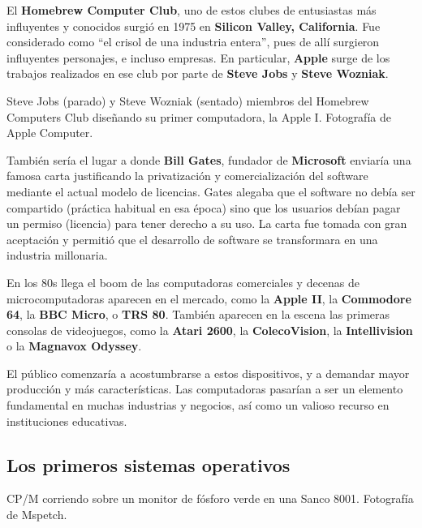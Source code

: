 El \textbf{Homebrew Computer Club}, uno de estos clubes de entusiastas más influyentes y
conocidos surgió en 1975 en \textbf{Silicon Valley, California}. Fue considerado
como ``el crisol de una industria entera'', pues de allí surgieron influyentes
personajes, e incluso empresas. En particular, \textbf{Apple} surge de los
trabajos realizados en ese club por parte de \textbf{Steve Jobs} y
\textbf{Steve Wozniak}.

{Steve Jobs (parado) y Steve Wozniak (sentado) miembros del Homebrew Computers Club
diseñando su primer computadora, la Apple I.}
{Fotografía de Apple Computer.}

También sería el lugar a donde \textbf{Bill Gates}, fundador de \textbf{Microsoft}
enviaría una famosa carta justificando la privatización y comercialización del
software mediante el actual modelo de licencias. Gates alegaba que el software
no debía ser compartido (práctica habitual en esa época) sino que los usuarios
debían pagar un permiso (licencia) para tener derecho a su uso. La carta fue tomada
con gran aceptación y permitió que el desarrollo de software se transformara en
una industria millonaria.

En los 80s llega el boom de las computadoras comerciales y decenas de
microcomputadoras aparecen en el mercado, como la \textbf{Apple II}, la
\textbf{Commodore 64}, la \textbf{BBC Micro}, o \textbf{TRS 80}. También
aparecen en la escena las primeras consolas de videojuegos, como la
\textbf{Atari 2600}, la \textbf{ColecoVision}, la \textbf{Intellivision} o la
\textbf{Magnavox Odyssey}.

El público comenzaría a acostumbrarse a estos dispositivos, y a demandar mayor
producción y más características. Las computadoras pasarían a ser un elemento
fundamental en muchas industrias y negocios, así como un valioso recurso
en instituciones educativas.

\subsection{Los primeros sistemas operativos}

{CP/M corriendo sobre un monitor de fósforo verde en una Sanco 8001.}
{Fotografía de Mspetch.}

